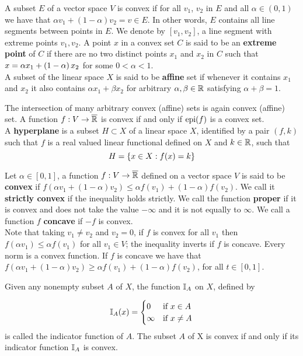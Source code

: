 A subset $E$ of a vector space $V$ is convex if for all $v_1$, $v_2$ in $E$ and all $\alpha \in (0,1)$ we have that $\alpha v_1+(1-\alpha)v_2=v\in E$.
In other words, $E$ contains all line segments between points in $E$. We denote by $[v_1, v_2]$, a line segment with extreme points $v_1, v_2$.
A point $x$ in a convex set $C$ is said to be an \textbf{extreme point} of $C$ if there are no two distinct points $x_1$ and $x_2$ in $C$ such that $x = \alpha x_1 + \left( 1-\alpha \right)x_2$ for some $0<\alpha <1$.
\\
A subset of the linear space $X$ is said to be \textbf{affine} set if whenever it contains $x_1$ and $x_2$ it also contains $\alpha x_1+\beta x_2$ for arbitrary $\alpha, \beta \in \mathbb{R}$ satisfying $\alpha+\beta=1$.

The intersection of many arbitrary convex (affine) sets is again convex (affine) set. A function $f: V \rightarrow \overline{\mathbb{R}}$ is convex if and only if $\mathrm{epi}(f)$ is a convex set.\\

A \textbf{hyperplane} is a subset $H\subset X$ of a linear space $X$, identified by a pair $(f, k)$ such that $f$ is a real valued linear functional defined on $X$ and $k\in \mathbb{R}$, such that
\begin{equation}
	H=\left\lbrace x\in X: f(x)=k \right\rbrace
\end{equation}

Let $\alpha\in [0,1]$, a function $f:V\rightarrow \overline{\mathbb{R}}$ defined on a vector space $V$ is said to be \textbf{convex} if $f(\alpha v_1+(1-\alpha)v_2)\leq \alpha f(v_1)+(1-\alpha)f(v_2)$. We call it \textbf{strictly convex} if the inequality holds strictly. We call the function \textbf{proper} if it is convex and does not take the value $-\infty$ and it is not equally to $\infty$. We call a function $f$ \textbf{concave} if $-f$ is convex. \\

Note that taking $v_1\neq v_2$ and $v_2=0$, if $f$ is convex for all $v_1$ then $f(\alpha v_1)\leq \alpha f(v_1)$ for all $v_1\in V$; the inequality inverts if $f$ is concave. Every norm is a convex function. If $f$ is concave we have that $f(\alpha v_1+(1-\alpha)v_2)\geq \alpha f(v_1)+(1-\alpha)f(v_2)$, for all $t\in [0,1]$.

Given any nonempty subset $A$ of $X$, the function $\mathbb{I}_{A}$ on $X$, defined by

\begin{equation*}
\mathbb{I}_{A}(x)=\begin{cases}
	0 & \text{if } x \in A\\
	\infty & \text{if } x \neq A
	\end{cases}
\end{equation*}
is called the indicator function of $A$. The subset $A$ of X is convex if and only if its indicator function $\mathbb{I}_{A}$ is convex.


